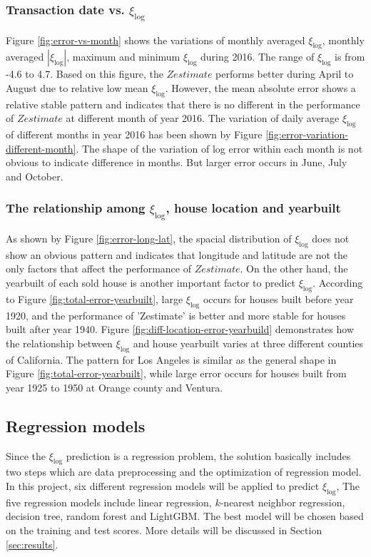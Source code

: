 \documentclass[12pt]{article}
\begin{document}
\subsubsection{Transaction date vs. $\xi_{\log}$}
Figure \ref{fig:error-vs-month} shows the variations of monthly averaged $\xi_{\log}$, monthly averaged $|\xi_{\log}|$, maximum and minimum $\xi_{\log}$ during 2016. The range of $\xi_{\log}$ is from -4.6 to 4.7. Based on this figure, the $Zestimate$ performs better during April to August due to relative low mean $\xi_{\log}$. However, the mean absolute error shows a relative stable pattern and indicates that there is no different in the performance of $Zestimate$ at different month of year 2016. The variation of daily average $\xi_{\log}$ of different months in year 2016 has been shown by Figure \ref{fig:error-variation-different-month}. The shape of the variation of log error within each month is not obvious to indicate difference in months. But larger error occurs in June, July and October.

\subsubsection{The relationship among $\xi_{\log}$, house location and yearbuilt}
As shown by Figure \ref{fig:error-long-lat}, the spacial distribution of $\xi_{\log}$ does not show an obvious pattern and indicates that longitude and latitude are not the only factors that affect the performance of $Zestimate$. On the other hand, the yearbuilt of each sold house is another important factor to predict $\xi_{\log}$. According to Figure \ref{fig:total-error-yearbuilt}, large $\xi_{\log}$ occurs for houses built before year 1920, and the performance of 'Zestimate' is better and more stable for houses built after year 1940. Figure \ref{fig:diff-location-error-yearbuild} demonstrates how the relationship between $\xi_{\log}$ and house yearbuilt varies at three different counties of California. The pattern for Los Angeles is similar as the general shape in Figure \ref{fig:total-error-yearbuilt}, while large error occurs for houses built from year 1925 to 1950 at Orange county and Ventura. 
 
\subsection{Regression models}
Since the $\xi_{\log}$ prediction is a regression problem, the solution basically includes two steps which are data preprocessing and the optimization of regression model. In this project, six different regression models will be applied to predict $\xi_{\log}$,  The five regression models include linear regression, $k$-nearest neighbor regression, decision tree, random forest and LightGBM. The best model will be chosen based on the training and test scores. More details will be discussed in Section \ref{sec:results}.
\end{document}
